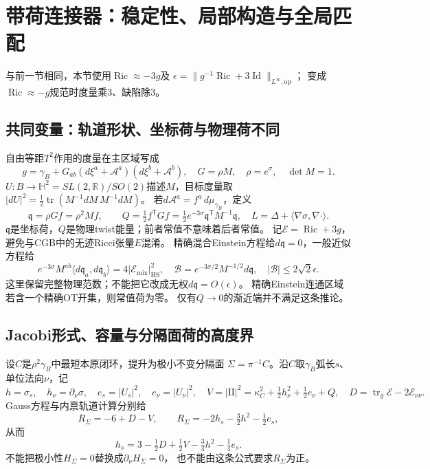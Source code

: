 \documentclass[UTF8,a4paper,11pt,fontset=fandol]{ctexart}
\numberwithin{equation}{section}
\theoremstyle{definition}
\newcommand{\Ric}{\operatorname{Ric}}
\newcommand{\tr}{\operatorname{tr}}
\newcommand{\Id}{\operatorname{Id}}
\newcommand{\op}{\mathrm{op}}
\newcommand{\R}{\mathbb R}
\begin{document}
\section{带荷连接器：稳定性、局部构造与全局匹配}
与前一节相同，本节使用$\Ric\approx-3g$及
$\epsilon=\|g^{-1}\Ric+3\Id\|_{L^\infty,\op}$；
变成$\Ric\approx-g$规范时度量乘3、缺陷除3。

\subsection{共同变量：轨道形状、坐标荷与物理荷不同}
自由等距$T^2$作用的度量在主区域写成
\[
 g=\gamma_B+G_{ab}(d\xi^a+\mathcal A^a)(d\xi^b+\mathcal A^b),
 \quad G=\rho M,\quad\rho=e^\sigma,\quad\det M=1.
\]
$U:B\to\mathbb H^2=SL(2,\R)/SO(2)$描述$M$，目标度量取
$|dU|^2=\tfrac12\tr(M^{-1}dM\,M^{-1}dM)$。
若$d\mathcal A^a=f^a\,d\mu_{\gamma_B}$，定义
\begin{equation}\label{eq:charged-dictionary}
 \mathfrak q=\rho Gf=\rho^2Mf,\qquad
 Q=\tfrac12 f^{\mathsf T}Gf
   =\tfrac12 e^{-3\sigma}\mathfrak q^{\mathsf T}M^{-1}\mathfrak q,
 \quad L=\Delta+\langle\nabla\sigma,\nabla\cdot\rangle.
\end{equation}
$\mathfrak q$是坐标荷，$Q$是物理twist能量；前者常值不意味着后者常值。
记$\mathcal E=\Ric+3g$，避免与CGB中的无迹Ricci张量$E$混淆。
精确混合Einstein方程给$d\mathfrak q=0$，一般近似方程给
\begin{equation}\label{eq:physical-charge-source}
 e^{-3\sigma}M^{ab}\langle d\mathfrak q_a,d\mathfrak q_b\rangle
 =4|\mathcal E_{\mathrm{mix}}|_{\mathrm{HS}}^2,
 \quad
 \mathscr B=e^{-3\sigma/2}M^{-1/2}d\mathfrak q,
 \quad |\mathscr B|\le2\sqrt2\epsilon.
\end{equation}
这里保留完整物理范数；不能把它改成无权$d\mathfrak q=O(\epsilon)$。
精确Einstein连通区域若含一个精确OT开集，则常值荷为零。
仅有$Q\to0$的渐近端并不满足这条推论。

\subsection{Jacobi形式、容量与分隔面荷的高度界}
设$C$是$\rho^2\gamma_B$中最短本原闭环，提升为极小不变分隔面
$\Sigma=\pi^{-1}C$。沿$C$取$\gamma_B$弧长$s$、单位法向$\nu$，记
\[
 h=\sigma_s,\quad h_\nu=\partial_\nu\sigma,\quad
 e_s=|U_s|^2,\quad e_\nu=|U_\nu|^2,\quad
 V=|\mathrm{II}|^2=\kappa_C^2+\tfrac12h_\nu^2+\tfrac12e_\nu+Q,
 \quad D=\tr_g\mathcal E-2\mathcal E_{\nu\nu}.
\]
Gauss方程与内禀轨道计算分别给
\[
 R_\Sigma=-6+D-V,
 \qquad R_\Sigma=-2h_s-\tfrac32h^2-\tfrac12e_s,
\]
从而
\begin{equation}\label{eq:separator-h-identity}
 h_s=3-\tfrac12D+\tfrac12V-\tfrac34h^2-\tfrac14e_s.
\end{equation}
不能把极小性$H_\Sigma=0$替换成$\partial_\nu H_\Sigma=0$，
也不能由这条公式要求$R_\Sigma$为正。
\end{document}
